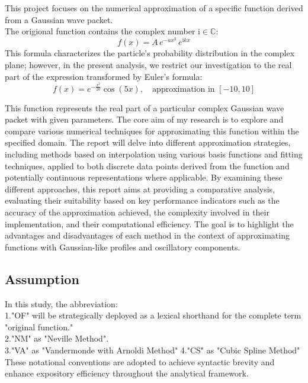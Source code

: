 \documentclass[11pt]{article}
\begin{document}
This project focuses on the numerical approximation of a specific function derived from a Gaussian wave packet.\\
The origional function contains the complex number $\mathrm{i}\in\mathbb{C}$:
\begin{equation}
  f(x) = A \, e^{-a x^2} \, e^{\mathrm{i} k x}
\end{equation}
This formula characterizes the particle's probability distribution in the complex plane; however, in the present analysis, 
we restrict our investigation to the real part of the expression transformed by Euler's formula:\\
\begin{equation}
  f(x) = e^{-\frac{x^2}{20}} \cos(5x), \quad \text{approximation in } [-10, 10]
\end{equation}

This function represents the real part of a particular complex Gaussian wave packet with given parameters. The core aim of my research 
is to explore and compare various numerical techniques for approximating this function within the specified domain. The report will delve 
into different approximation strategies, including methods based on interpolation using various basis functions and fitting techniques, 
applied to both discrete data points derived from the function and potentially continuous representations where applicable. By examining 
these different approaches, this report aims at providing a comparative analysis, evaluating their suitability based on key performance 
indicators such as the accuracy of the approximation achieved, the complexity involved in their implementation, and their computational 
efficiency. The goal is to highlight the advantages and disadvantages of each method in the context of approximating functions with 
Gaussian-like profiles and oscillatory components.


\subsection{Assumption}
In this study, the abbreviation: \\
1."OF" will be strategically deployed as a lexical shorthand for the complete term "original function." \\
2."NM" as "Neville Method".\\
3."VA" as "Vandermonde with Arnoldi Method"
4."CS" as "Cubic Spline Method"
These notational conventions are adopted to achieve syntactic brevity and enhance expository efficiency throughout the analytical framework.
\end{document}

